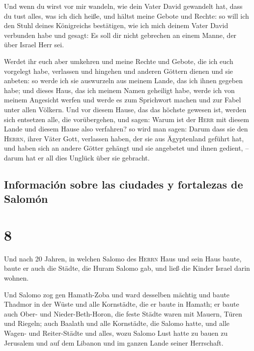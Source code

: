  Und wenn du wirst vor mir wandeln, wie dein Vater David
gewandelt hat, dass du tust alles, was ich dich heiße, und hältst meine
Gebote und Rechte:  so will ich den Stuhl deines
Königreichs bestätigen, wie ich mich deinem Vater David verbunden habe
und gesagt: Es soll dir nicht gebrechen an einem Manne, der über Israel
Herr sei.

 Werdet ihr euch aber umkehren und meine Rechte und
Gebote, die ich euch vorgelegt habe, verlassen und hingehen und anderen
Göttern dienen und sie anbeten:  so werde ich sie
auswurzeln aus meinem Lande, das ich ihnen gegeben habe; und dieses
Haus, das ich meinem Namen geheiligt habe, werde ich von meinem
Angesicht werfen und werde es zum Sprichwort machen und zur Fabel unter
allen Völkern.  Und vor diesem Hause, das das höchste
gewesen ist, werden sich entsetzen alle, die vorübergehen, und sagen:
Warum ist der \textsc{Herr} mit diesem Lande und diesem Hause also
verfahren?  so wird man sagen: Darum dass sie den
\textsc{Herrn}, ihrer Väter Gott, verlassen haben, der sie aus
Ägyptenland geführt hat, und haben sich an andere Götter gehängt und sie
angebetet und ihnen gedient, -- darum hat er all dies Unglück über sie
gebracht.

\hypertarget{informaciuxf3n-sobre-las-ciudades-y-fortalezas-de-salomuxf3n}{%
\subsection{Información sobre las ciudades y fortalezas de
Salomón}\label{informaciuxf3n-sobre-las-ciudades-y-fortalezas-de-salomuxf3n}}

\hypertarget{section-7}{%
\section{8}\label{section-7}}

 Und nach 20 Jahren, in welchen Salomo des \textsc{Herrn}
Haus und sein Haus baute,  baute er auch die Städte, die
Huram Salomo gab, und ließ die Kinder Israel darin wohnen.

 Und Salomo zog gen Hamath-Zoba und ward desselben mächtig
 und baute Thadmor in der Wüste und alle Kornstädte, die
er baute in Hamath;  er baute auch Ober- und
Nieder-Beth-Horon, die feste Städte waren mit Mauern, Türen und Riegeln;
 auch Baalath und alle Kornstädte, die Salomo hatte, und
alle Wagen- und Reiter-Städte und alles, wozu Salomo Lust hatte zu bauen
zu Jerusalem und auf dem Libanon und im ganzen Lande seiner Herrschaft.

